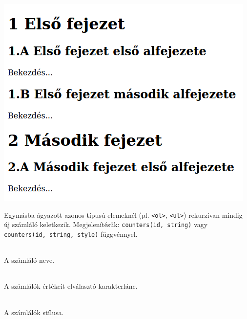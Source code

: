 \begin{frame}
  \begin{columns}[c]
      \begin{exampleblock}{}
        \scriptsize
        
      \end{exampleblock}
      \begin{exampleblock}{}
        \scriptsize
        
      \end{exampleblock}
  \end{columns}
\end{frame}

\begin{frame}
  \begin{center}
    \includegraphics[width=.5\textwidth]{szamozottFejezet.png}\\
  \end{center}
\end{frame}

\begin{frame}
  Egymásba ágyazott azonos típusú elemeknél (pl. \texttt{<ol>}, \texttt{<ul>}) rekurzívan mindig új számláló keletkezik. Megjelenítésük: \texttt{counters(id, string)} vagy \texttt{counters(id, string, style)} függvénnyel.
  \begin{description}[m]
    \item[\texttt{id}] \hfill \\ A számláló neve.
    \item[\texttt{string}] \hfill \\ A számlálók értékeit elválasztó karakterlánc.
    \item[\texttt{style}] \hfill \\ A számlálók stílusa.
  \end{description}
\end{frame}

